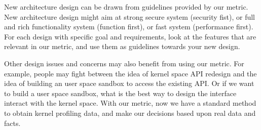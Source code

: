 New architecture design can be drawn from guidelines provided by our metric. 
New architecture design might aim at strong secure system (security fist), or full and rich functionality system 
(function first), or fast system (performance first). For each design with specific goal and requirements, look at the
features that are relevant in our metric, and use them as guidelines towards your new design. 
    
Other design issues and concerns may also benefit from using our metric. For example, people may fight between
the idea of kernel space API redesign and the idea of building an user space sandbox to access the existing API. 
Or if we want to build a user space sandbox, what is the best way to design the interface interact with the kernel space.
With our metric, now we have a standard method to obtain kernel profiling data, and make our decisions based upon 
real data and facts.